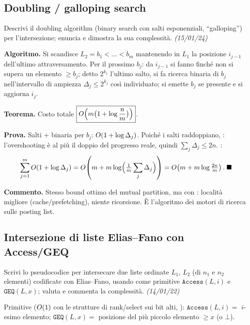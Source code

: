 \subsection*{ Doubling / galloping search}

\begin{domanda}
Descrivi il doubling algorithm (binary search con salti esponenziali, ``galloping'') per
l'intersezione; enuncia e dimostra la sua complessit\`a. \emph{(15/01/24)}
\end{domanda}

\textbf{Algoritmo.} Si scandisce $L_2=b_1<\dots<b_m$ mantenendo in $L_1$ la posizione $i_{j-1}$
dell'ultimo attraversamento. Per il prossimo $b_j$: da $i_{j-1}$ si fanno  finch\'e non si supera un elemento $\ge b_j$; detto $2^{k_j}$ l'ultimo salto, si
fa ricerca binaria di $b_j$ nell'intervallo di ampiezza $\Delta_j\le 2^{k_j}$ cos\`i individuato;
si emette $b_j$ se presente e si aggiorna $i_j$.

\textbf{Teorema.} Costo totale $\boxed{O\!\left(m\bigl(1+\log\frac{n}{m}\bigr)\right)}$.

\textbf{Prova.} Salti + binaria per $b_j$: $O\!\left(1+\log\Delta_j\right)$. Poich\'e i salti raddoppiano,
: l'overshooting \`e al pi\`u il doppio del progresso reale,
quindi $\sum_j\Delta_j\le 2n$. :
\[
\sum_{j=1}^{m}O\!\left(1+\log\Delta_j\right)
=O\!\left(m+m\log\Bigl(\tfrac{1}{m}\sum_j\Delta_j\Bigr)\right)
=O\!\left(m+m\log\tfrac{2n}{m}\right). \;\blacksquare
\]

\textbf{Commento.} Stesso bound ottimo del mutual partition, ma con : localit\`a migliore (cache/prefetching), niente ricorsione. \`E l'algoritmo dei motori di
ricerca sulle posting list.

\subsection*{ Intersezione di liste Elias--Fano con Access/GEQ}

\begin{domanda}
Scrivi lo pseudocodice per intersecare due liste ordinate $L_1$, $L_2$ (di $n_1$ e $n_2$ elementi)
codificate con Elias--Fano, usando come primitive $\texttt{Access}(L,i)$ e $\texttt{GEQ}(L,x)$;
valuta e commenta la complessit\`a. \emph{(14/01/22)}
\end{domanda}

Primitive ($O\!\left(1\right)$ con le strutture di rank/select sui bit alti, ):
$\texttt{Access}(L,i)=$ $i$-esimo elemento; $\texttt{GEQ}(L,x)=$ posizione del pi\`u piccolo
elemento $\ge x$ (o $\bot$).

